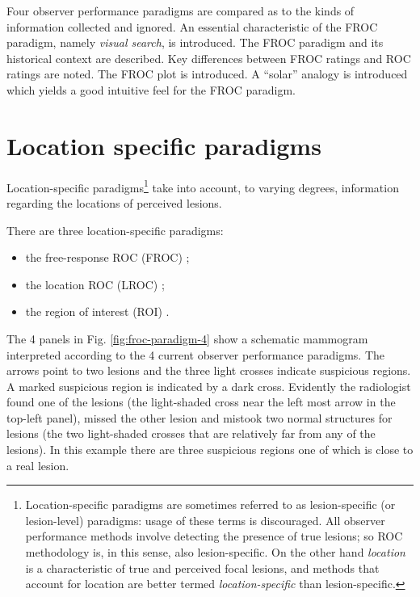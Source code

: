 \documentclass[
]{book}
\providecommand{\tightlist}{%
  \setlength{\itemsep}{0pt}\setlength{\parskip}{0pt}}
\begin{document}
Four observer performance paradigms are compared as to the kinds of information collected and ignored. An essential characteristic of the FROC paradigm, namely \emph{visual search}, is introduced. The FROC paradigm and its historical context are described. Key differences between FROC ratings and ROC ratings are noted. The FROC plot is introduced. A ``solar'' analogy is introduced which yields a good intuitive feel for the FROC paradigm.

\hypertarget{froc-paradigm-location-specific-paradigms}{%
\section{Location specific paradigms}\label{froc-paradigm-location-specific-paradigms}}

Location-specific paradigms\footnote{Location-specific paradigms are sometimes referred to as lesion-specific (or lesion-level) paradigms: usage of these terms is discouraged. All observer performance methods involve detecting the presence of true lesions; so ROC methodology is, in this sense, also lesion-specific. On the other hand \emph{location} is a characteristic of true and perceived focal lesions, and methods that account for location are better termed \emph{location-specific} than lesion-specific.} take into account, to varying degrees, information regarding the locations of perceived lesions.

There are three location-specific paradigms:

\begin{itemize}
\tightlist
\item
  the free-response ROC (FROC) \citep{bunch1977free, chakraborty1989maximum};
\item
  the location ROC (LROC) \citep{starr1977comments, swensson1996unified};
\item
  the region of interest (ROI) \citep{obuchowski2010data}.
\end{itemize}

The 4 panels in Fig. \ref{fig:froc-paradigm-4} show a schematic mammogram interpreted according to the 4 current observer performance paradigms. The arrows point to two lesions and the three light crosses indicate suspicious regions. A marked suspicious region is indicated by a dark cross. Evidently the radiologist found one of the lesions (the light-shaded cross near the left most arrow in the top-left panel), missed the other lesion and mistook two normal structures for lesions (the two light-shaded crosses that are relatively far from any of the lesions). In this example there are three suspicious regions one of which is close to a real lesion.
\end{document}
